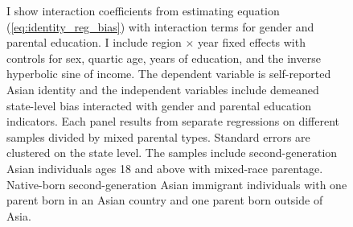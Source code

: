 \begin{center}
\begin{figure}[!htb]
\caption*{\footnotesize{I show interaction coefficients from estimating equation (\ref{eq:identity_reg_bias}) with interaction terms for gender and parental education. I include region $\times$ year fixed effects with controls for sex, quartic age, years of education, and the inverse hyperbolic sine of income. The dependent variable is self-reported Asian identity and the independent variables include demeaned state-level bias interacted with gender and parental education indicators. Each panel results from separate regressions on different samples divided by mixed parental types. Standard errors are clustered on the state level. The samples include second-generation Asian individuals ages 18 and above with mixed-race parentage. Native-born second-generation Asian immigrant individuals with one parent born in an Asian country and one parent born outside of Asia.}}
\end{figure}
\end{center}

\pagebreak
\newpage

